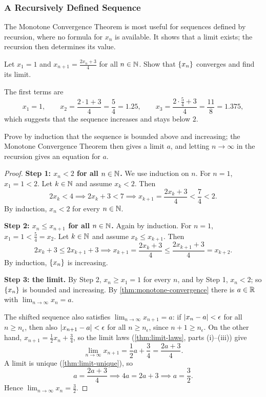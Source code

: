 \subsubsection{A Recursively Defined Sequence}
The Monotone Convergence Theorem is most useful for sequences defined by recursion, where no formula for $x_n$ is available. It shows that a limit exists; the recursion then determines its value.

\begin{example}\label{ex:recursive-mct}
    Let $x_1=1$ and $x_{n+1}=\frac{2x_n+3}{4}$ for all $n\in\mathbb{N}$. Show that $\left\{x_n\right\}$ converges and find its limit.
\end{example}
The first terms are
\[
    x_1=1,\qquad x_2=\frac{2\cdot1+3}{4}=\frac54=1.25,\qquad x_3=\frac{2\cdot\frac54+3}{4}=\frac{11}8=1.375,
\]
which suggests that the sequence increases and stays below $2$.
\begin{idea}
    Prove by induction that the sequence is bounded above and increasing; the Monotone Convergence Theorem then gives a limit $a$, and letting $n\to\infty$ in the recursion gives an equation for $a$.
\end{idea}
\begin{proof}
    \textbf{Step 1: $x_n<2$ for all $n\in\mathbb{N}$.} We use induction on $n$. For $n=1$, $x_1=1<2$. Let $k\in\mathbb{N}$ and assume $x_k<2$. Then
    \[
        2x_k<4\implies 2x_k+3<7\implies x_{k+1}=\frac{2x_k+3}{4}<\frac74<2.
    \]
    By induction, $x_n<2$ for every $n\in\mathbb{N}$.

    \textbf{Step 2: $x_n\leq x_{n+1}$ for all $n\in\mathbb{N}$.} Again by induction. For $n=1$, $x_1=1<\frac54=x_2$. Let $k\in\mathbb{N}$ and assume $x_k\leq x_{k+1}$. Then
    \[
        2x_k+3\leq 2x_{k+1}+3\implies x_{k+1}=\frac{2x_k+3}{4}\leq\frac{2x_{k+1}+3}{4}=x_{k+2}.
    \]
    By induction, $\left\{x_n\right\}$ is increasing.

    \textbf{Step 3: the limit.} By Step 2, $x_n\geq x_1=1$ for every $n$, and by Step 1, $x_n<2$; so $\left\{x_n\right\}$ is bounded and increasing. By \cref{thm:monotone-convergence} there is $a\in\mathbb{R}$ with $\lim_{n\to\infty}x_n=a$.

    The shifted sequence also satisfies $\lim_{n\to\infty}x_{n+1}=a$: if $\left|x_n-a\right|<\epsilon$ for all $n\geq n_\epsilon$, then also $\left|x_{n+1}-a\right|<\epsilon$ for all $n\geq n_\epsilon$, since $n+1\geq n_\epsilon$. On the other hand, $x_{n+1}=\frac12x_n+\frac34$, so the limit laws (\cref{thm:limit-laws}, parts (i)--(iii)) give
    \[
        \lim_{n\to\infty}x_{n+1}=\frac12a+\frac34=\frac{2a+3}{4}.
    \]
    A limit is unique (\cref{thm:limit-unique}), so
    \[
        a=\frac{2a+3}{4}\implies 4a=2a+3\implies a=\frac32.
    \]
    Hence $\lim_{n\to\infty}x_n=\frac32$.
\end{proof}

